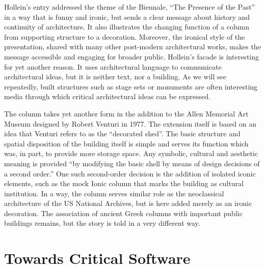 Hollein's entry addressed the theme of the Biennale, ``The Presence of the Past'' in a way that
is funny and ironic, but sends a clear message about history and continuity of architecture. It
also illustrates the changing function of a column from supporting structure to a decoration. Moreover,
the ironical style of the presentation, shared with many other post-modern architectural works, makes
the message accessible and engaging for broader public. Hollein's facade is interesting for
yet another reason. It uses architectural language to communicate architectural ideas, but it
is neither text, nor a building. As we will see repeatedly, built structures such as stage sets
or monuments are often interesting media through which critical architectural ideas can be
expressed.

The column takes yet another form in the addition to the Allen Memorial Art Museum designed by
Robert Venturi in 1977. The extension itself is based on an idea that Venturi refers to as
the ``decorated shed''. The basic structure and spatial disposition of the building itself is
simple and serves its function which was, in part, to provide more storage space.
Any symbolic, cultural and aesthetic meaning is provided ``by modifying the basic shell by means
of design decisions of a second order.'' One such second-order
decision is the addition of isolated iconic elements, such as the mock Ionic column that
marks the building as cultural institution. In a way, the column serves similar role as the
neoclassical architecture of the US National Archives, but is here added merely as an ironic
decoration. The association of ancient Greek columns with important public buildings remains,
but the story is told in a very different way.

%
%
%
%

\section{Towards Critical Software}

